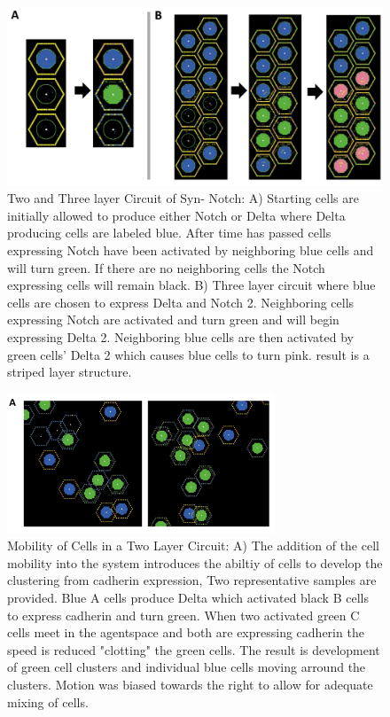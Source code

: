 \documentclass[12pt]{ifacconf}
\begin{document}
\begin{figure}
\begin{center}
\includegraphics[width=\textwidth]{Two_and_Three_layer_Two_Genotype}    %
\caption{Two and Three layer Circuit of Syn- Notch: A) Starting cells are initially allowed to produce either Notch or Delta where Delta producing cells are labeled blue. After time has passed cells expressing Notch have been activated by neighboring blue cells and will turn green. If there are no neighboring cells the Notch expressing cells will remain black. B) Three layer circuit where blue cells are chosen to express Delta and Notch 2. Neighboring cells expressing Notch are activated and turn green and will begin expressing Delta 2. Neighboring blue cells are then activated by green cells' Delta 2 which causes blue cells to turn pink. result is a striped layer structure.  } 
\label{fig:bifurcation}
\end{center}
\end{figure}

\begin{figure}
\begin{center}
\includegraphics[width=8.0cm]{Mobility_Two_layer}    %
\caption{Mobility of Cells in a Two Layer Circuit: A) The addition of the cell mobility into the system introduces the abiltiy of cells to develop the clustering from cadherin expression, Two representative samples are provided. Blue A cells produce Delta which activated black B cells to express cadherin and turn green. When two activated green C cells meet in the agentspace and both are expressing cadherin the speed is reduced "clotting" the green cells. The result is development of green cell clusters and individual blue cells moving arround the clusters. Motion was biased towards the right to allow for adequate mixing of cells.   } 
\label{fig:bifurcation}
\end{center}
\end{figure}
\end{document}
